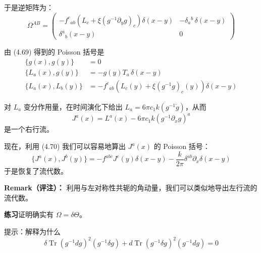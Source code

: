 于是逆矩阵为：
\begin{equation}
  \Omega^{AB} =
  \begin{pmatrix}
    -f^c{}_{ab}\left(L_c + \xi\left(g^{-1}\partial_y g\right)_c\right)\delta(x-y) & -\delta_a{}^b\,\delta(x-y)\\[4pt]
    \delta^a{}_b(x-y) & 0
  \end{pmatrix}
  \tag{4.69}
  \label{eq:4.69}
\end{equation}

由 (4.69) 得到的 Poisson 括号是
\begin{equation}
  \begin{aligned}
    \{g(x), g(y)\} &= 0\\
    \{L_a(x), g(y)\} &= -g(y)T_a\,\delta(x-y)\\
    \{L_a(x), L_b(y)\} &= -f^c{}_{ab}\left(L_c(y) + \xi\left(g^{-1}g\right)_c(y)\right)\delta(x-y)
  \end{aligned}
  \tag{4.70}
  \label{eq:4.70}
\end{equation}

对 $L_a$ 变分作用量，在时间演化下给出 $L_a=6\pi c_1 k(g^{-1}\dot g)$，从而
\begin{equation}
  J^a(x) = L^a(x) - 6\pi c_1 k\left(g^{-1}\partial_x g\right)^a
  \tag{4.71}
  \label{eq:4.71}
\end{equation}
是一个右行流。

现在，利用 (4.70) 我们可以容易地算出 $J^a(x)$ 的 Poisson 括号：
\begin{equation}
  \{J^a(x), J^b(y)\} = -f^{abc}J^c(y)\delta(x-y) - \frac{k}{2\pi}\delta^{ab}\partial_x\delta(x-y)
  \tag{4.72}
  \label{eq:4.72}
\end{equation}
于是恢复了流代数。

\textbf{Remark（评注）：} 利用与左对称性共轭的角动量，我们可以类似地导出左行流的流代数。

\medskip
\noindent\textbf{练习}\quad 证明确实有 $\Omega=\delta\Theta$。

提示：解释为什么
\begin{equation}
  \delta\operatorname{Tr}\left(g^{-1}dg\right)^2\left(g^{-1}\delta g\right) + d\operatorname{Tr}\left(g^{-1}\delta g\right)^2\left(g^{-1}dg\right) = 0
  \tag{4.73}
  \label{eq:4.73}
\end{equation}
